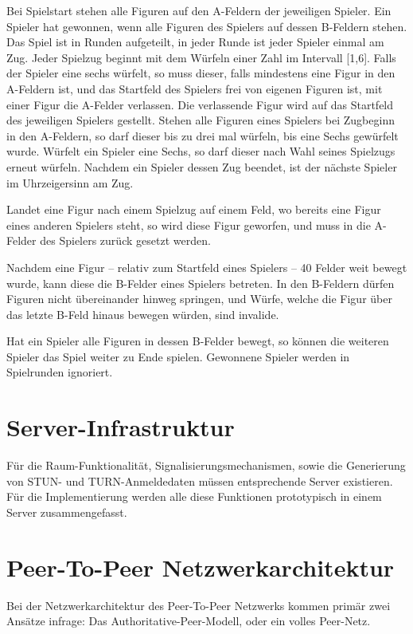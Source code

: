 Bei Spielstart stehen alle Figuren auf den A-Feldern der jeweiligen Spieler. Ein Spieler hat gewonnen, wenn alle Figuren des Spielers auf dessen B-Feldern stehen. Das Spiel ist in Runden aufgeteilt, in jeder Runde ist jeder Spieler einmal am Zug. Jeder Spielzug beginnt mit dem Würfeln einer Zahl im Intervall [1,6]. Falls der Spieler eine sechs würfelt, so muss dieser, falls mindestens eine Figur in den A-Feldern ist, und das Startfeld des Spielers frei von eigenen Figuren ist, mit einer Figur die A-Felder verlassen. Die verlassende Figur wird auf das Startfeld des jeweiligen Spielers gestellt. Stehen alle Figuren eines Spielers bei Zugbeginn in den A-Feldern, so darf dieser bis zu drei mal würfeln, bis eine Sechs gewürfelt wurde. Würfelt ein Spieler eine Sechs, so darf dieser nach Wahl seines Spielzugs erneut würfeln. Nachdem ein Spieler dessen Zug beendet, ist der nächste Spieler im Uhrzeigersinn am Zug.\par

Landet eine Figur nach einem Spielzug auf einem Feld, wo bereits eine Figur eines anderen Spielers steht, so wird diese Figur \glqq{}geworfen\grqq{}, und muss in die A-Felder des Spielers zurück gesetzt werden.\par

Nachdem eine Figur -- relativ zum Startfeld eines Spielers -- 40 Felder weit bewegt wurde, kann diese die B-Felder eines Spielers betreten. In den B-Feldern dürfen Figuren nicht übereinander hinweg springen, und Würfe, welche die Figur über das letzte B-Feld hinaus bewegen würden, sind invalide.\par

Hat ein Spieler alle Figuren in dessen B-Felder bewegt, so können die weiteren Spieler das Spiel weiter zu Ende spielen. Gewonnene Spieler werden in Spielrunden ignoriert.\par

\section{Server-Infrastruktur}
Für die Raum-Funktionalität, Signalisierungsmechanismen, sowie die Generierung von STUN- und TURN-Anmeldedaten müssen entsprechende Server existieren. Für die Implementierung werden alle diese Funktionen prototypisch in einem Server zusammengefasst.

\section{Peer-To-Peer Netzwerkarchitektur}
Bei der Netzwerkarchitektur des Peer-To-Peer Netzwerks kommen primär zwei Ansätze infrage: Das Authoritative-Peer-Modell, oder ein volles Peer-Netz.\par 

